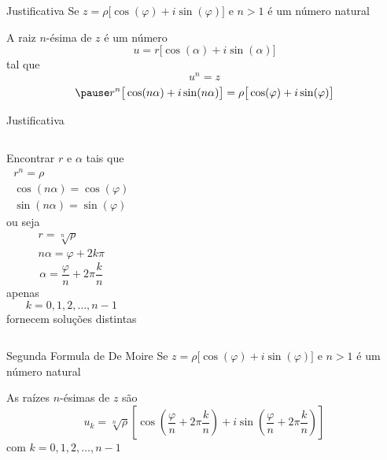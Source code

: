 \begin{proofframe}{Justificativa}
  Se
  \(
    z = \rho \big[\cos(\varphi) + i\sin(\varphi)\big]
  \)
  e $n>1$ é um número natural

  \pause
  \vspace{\baselineskip}
  A raiz $n$-ésima de $z$ é um número
  \[
    u = r \big[\cos(\alpha) + i\sin(\alpha)\big]
  \]
  \pause
  tal que
  \[
    u^n = z
  \]
  \[
    \pause
    r^n \big[\cos(n\alpha) + i\sin(n\alpha)\big]
    = \rho \big[\cos(\varphi) + i\sin(\varphi)\big]
  \]
\end{proofframe}

\begin{proofframe}{Justificativa}
\begin{columns}
  Encontrar $r$ e $\alpha$
  \pause
   tais que
  \begin{gather*}
    r^n = \rho \\
    \cos(n\alpha) = \cos(\varphi) \\
    \sin(n\alpha) = \sin(\varphi)
  \end{gather*}
  \pause
  ou seja
  \begin{gather*}
    r = \sqrt[n]{\rho} \\
    n\alpha = \varphi + 2k\pi
  \end{gather*}
  \pause
  \[
    \alpha = \frac{\varphi}{n} + 2\pi\frac{k}{n}
  \]
  \pause
  apenas
  \[
    k = 0, 1, 2, \dots, n-1
  \]
  fornecem soluções distintas
\end{columns}
\end{proofframe}

\begin{frame}{Segunda Formula de De Moire}
  Se
  \(
    z = \rho \big[\cos(\varphi) + i\sin(\varphi)\big]
  \)
  e $n>1$ é um número natural

  \vspace{\baselineskip}
  As raízes $n$-ésimas de $z$ são
  \[
    u_k = \sqrt[n]{\rho}
    \left[
         \cos\left(\frac{\varphi}{n}+2\pi\frac{k}{n}\right)
      + i\sin\left(\frac{\varphi}{n}+2\pi\frac{k}{n}\right)
    \right]
  \]
  com \(k=0, 1, 2, \dots, n-1\)
\end{frame}

